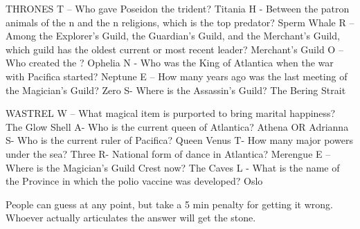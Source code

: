 \documentclass[green]{NeptuneBall}
\begin{document}
\name{\gWishingStone{}}

THRONES
T – Who gave Poseidon the trident?
Titania
H - Between the patron animals of the \pPacifica{}n and the \pAtlantica{}n religions, which is the top predator?
Sperm Whale
R –  Among the Explorer's Guild, the Guardian's Guild, and the Merchant's Guild, which guild has the oldest current or most recent leader?
Merchant’s Guild
O – Who created the \sArtifactTwo{}?
Ophelia
N - Who was the King of Atlantica when the war with Pacifica started?
Neptune
E – How many years ago was the last meeting of the Magician’s Guild?
Zero
S- Where is the Assassin's Guild?
The Bering Strait

WASTREL
W – What magical item is purported to bring marital happiness?
The Glow Shell
A- Who is the current queen of Atlantica?
Athena OR Adrianna
S- Who is the current ruler of Pacifica?
Queen Venus
T- How many major powers under the sea?
Three
R- National form of dance in Atlantica?
Merengue
E – Where is the Magician’s Guild Crest now?
The Caves
L - What is the name of the Province in which the polio vaccine was developed?
Oslo

People can guess at any point, but take a 5 min penalty for getting it wrong. Whoever actually articulates the answer will get the stone.
\end{document}
